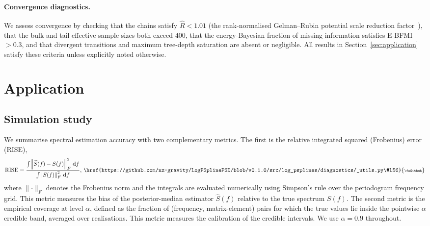 \documentclass[%
	reprint,
	nofootinbib,
	amsmath,
	amssymb,
	aps,
]{revtex4-2}
\DeclareRobustCommand{\codelink}[1]{\,\href{#1}{\mbox{\scalebox{0.65}{\faGithub}}}}
\begin{document}
	\paragraph{Convergence diagnostics.}
	We assess convergence by checking that the chains satisfy
	$\hat{R}<1.01$ (the rank-normalised Gelman--Rubin potential scale reduction factor~\cite{gelman1992inference, arviz_2019}), that the bulk and tail effective sample sizes both
	exceed $400$, that the energy-Bayesian fraction of missing
	information satisfies E-BFMI~$>0.3$, and that divergent transitions
	and maximum tree-depth saturation are absent or negligible. All results
	in Section~\ref{sec:application} satisfy these criteria unless
	explicitly noted otherwise.

	\section{\label{sec:application}Application}

	\subsection{Simulation study}
	\label{subsec:sim_3d_var2}

	We summarise spectral estimation accuracy with two complementary
	metrics. The first is the relative integrated squared (Frobenius)
	error (RISE),
	\begin{equation}
		\operatorname{RISE}= \frac{\int \! \left\lVert \widehat{S}(f) - S(f) \right\rVert_{F}^{2}
		\, \mathrm{d}f}{\int \! \left\lVert S(f) \right\rVert_{F}^{2} \, \mathrm{d}f}, \codelink{https://github.com/nz-gravity/LogPSplinePSD/blob/v0.1.0/src/log_psplines/diagnostics/_utils.py\#L56}
	\end{equation}
	where $\lVert \cdot \rVert_{F}$ denotes the Frobenius norm and the
	integrals are evaluated numerically using Simpson's rule over the
	periodogram frequency grid. This metric measures the bias of the
	posterior-median estimator $\widehat{S}(f)$ relative to the true
	spectrum $S(f)$. The second metric is the
	empirical coverage at level $\alpha$, defined as the fraction of
	(frequency, matrix-element) pairs for which the true values lie inside
	the pointwise $\alpha$ credible band, averaged over realisations. This
	metric measures the calibration of the credible intervals. We use
	$\alpha=0.9$
	throughout.\codelink{https://github.com/nz-gravity/LogPSplinePSD/blob/v0.1.0/src/log_psplines/diagnostics/_utils.py\#L131}
\end{document}
